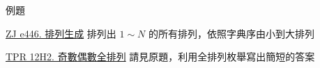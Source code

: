 \documentclass[aspectratio=169]{beamer}
\begin{document}
    \begin{frame}{例題}
        \begin{block}{\href{https://zerojudge.tw/ShowProblem?problemid=e446}{ZJ e446. 排列生成}}
            排列出 $1 \sim N$ 的所有排列，依照字典序由小到大排列
        \end{block}

        \begin{block}{\href{https://codeforces.com/group/H0qY3QmnOW/contest/339497/problem/H2}{TPR 12H2. 奇數偶數全排列}}
            請見原題，利用全排列枚舉寫出簡短的答案
        \end{block}
    \end{frame}
\end{document}
